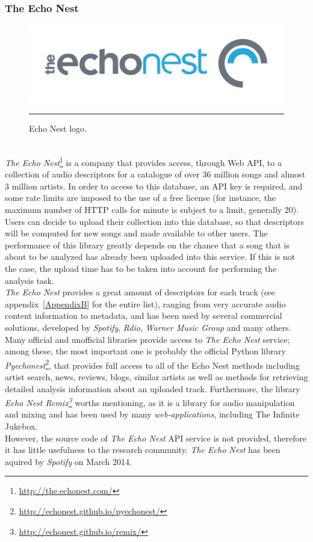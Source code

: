 \subsubsection*{The Echo Nest}
\begin{figure}[h]
\begin{center}
\includegraphics[scale=0.75]{Figures/echonest.jpg}
    \rule{20em}{0.5pt}
  \caption[Echo Nest]{Echo Nest logo.}
  \label{fig:Essentia}
\end{center}
\end{figure} \\
\textit{The Echo Nest}\footnote{\url{http://the.echonest.com/}} is a company that provides access, through Web API, to a collection of audio descriptors for a catalogue of over 36 million songs and almost 3 million artists. In order to access to this database, an API key is required, and some rate limits are imposed to the use of a free license (for instance, the maximum number of HTTP calls for minute is subject to a limit, generally 20). Users can decide to upload their collection into this database, so that descriptors will be computed for new songs and made available to other users. The performance of this library greatly depends on the chance that a song that is about to be analyzed has already been uploaded into this service. If this is not the case, the upload time has to be taken into account for performing the analysis task. \\ 
\textit{The Echo Nest} provides a great amount of descriptors for each track (see appendix~\ref{AppendixB} for the entire list), ranging from very accurate audio content information to metadata, and has been used by several commercial solutions, developed by \textit{Spotify}, \textit{Rdio}, \textit{Warner Music Group} and many others. Many official and unofficial libraries provide access to \textit{The Echo Nest} service; among these, the most important one is probably the official Python library \textit{Pyechonest}\footnote{\url{http://echonest.github.io/pyechonest/}}, that provides full access to all of the Echo Nest methods including artist search, news, reviews, blogs, similar artists as well as methods for retrieving detailed analysis information about an uploaded track. Furthermore, the library \textit{Echo Nest Remix\footnote{\url{http://echonest.github.io/remix/}}} worths mentioning, as it is a library for audio manipulation and mixing and has been used by many \textit{web-applications}, including The Infinite Jukebox. \\
However, the source code of \textit{The Echo Nest} API service is not provided, therefore it has little usefulness to the research community. \textit{The Echo Nest} has been aquired by \textit{Spotify} on March 2014.


